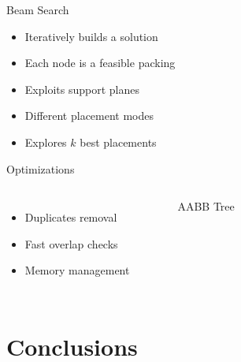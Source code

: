\documentclass{beamer}
\begin{document}
    \begin{frame}{Beam Search}
        \begin{itemize}
            \item Iteratively builds a solution
            \item Each node is a feasible packing
            \item Exploits support planes
            \item Different placement modes
            \item Explores $k$ best placements
        \end{itemize}
    \end{frame}
    \begin{frame}{Optimizations}
        \begin{columns}[onlytextwidth,T]
        \column{\dimexpr\linewidth-65mm-5mm}
            \begin{itemize}
                \item Duplicates removal
                \item Fast overlap checks
                \item Memory management
            \end{itemize}
        \column{65mm}
            \begin{figure}[h]
                \resizebox*{\columnwidth}{!}{%
                
                }
                \caption{AABB Tree}
            \end{figure}
        \end{columns}
    \end{frame}

    \section{Conclusions}
\end{document}
